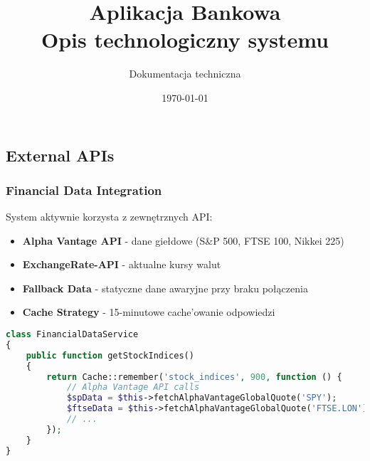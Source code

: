 \subsection{External APIs}

\subsubsection{Financial Data Integration}
System aktywnie korzysta z zewnętrznych API:

\begin{itemize}
    \item \textbf{Alpha Vantage API} - dane giełdowe (S\&P 500, FTSE 100, Nikkei 225)
    \item \textbf{ExchangeRate-API} - aktualne kursy walut
    \item \textbf{Fallback Data} - statyczne dane awaryjne przy braku połączenia
    \item \textbf{Cache Strategy} - 15-minutowe cache'owanie odpowiedzi
\end{itemize}

\begin{lstlisting}[language=PHP, caption=Integracja z FinancialDataService]
class FinancialDataService
{
    public function getStockIndices()
    {
        return Cache::remember('stock_indices', 900, function () {
            // Alpha Vantage API calls
            $spData = $this->fetchAlphaVantageGlobalQuote('SPY');
            $ftseData = $this->fetchAlphaVantageGlobalQuote('FTSE.LON');
            // ...
        });
    }
}
\end{lstlisting}\documentclass[12pt,a4paper]{article}
\usepackage[utf8]{inputenc}
\usepackage[polish]{babel}
\usepackage[T1]{fontenc}
\usepackage{geometry}
\usepackage{graphicx}
\usepackage{amsmath}
\usepackage{amsfonts}
\usepackage{amssymb}
\usepackage{enumitem}
\usepackage{booktabs}
\usepackage{longtable}
\usepackage{array}
\usepackage{xcolor}
\usepackage{hyperref}
\usepackage{listings}
\usepackage{fancyhdr}
\usepackage{tikz}
\usetikzlibrary{positioning,arrows.meta,shapes.geometric}

\geometry{margin=2.5cm}
\pagestyle{fancy}
\fancyhf{}
\fancyhead[R]{\thepage}

\title{\textbf{Aplikacja Bankowa}\\[0.5cm]\Large Opis technologiczny systemu}
\author{Dokumentacja techniczna}
\date{\today}




